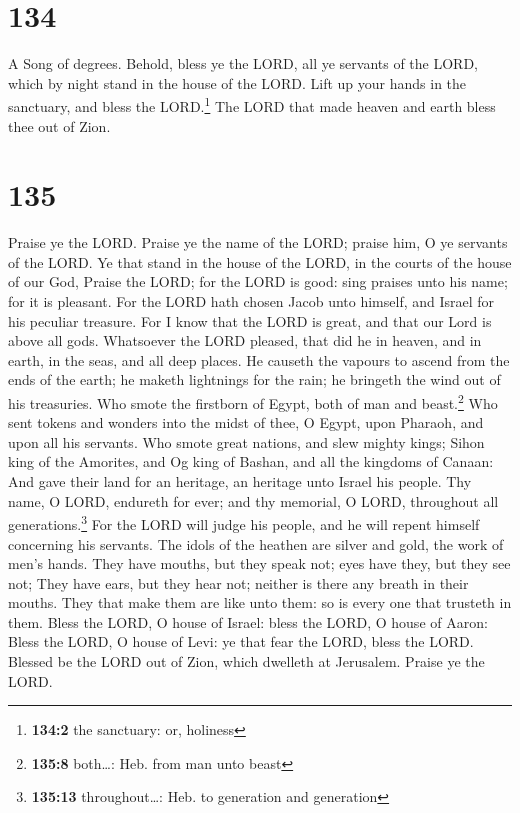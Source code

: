 \hypertarget{section-135}{%
\section{134}\label{section-135}}

A Song of degrees.  Behold, bless ye the LORD, all ye
servants of the LORD, which by night stand in the house of the LORD.
 Lift up your hands in the sanctuary, and bless the
LORD.\footnote{\textbf{134:2} the sanctuary: or, holiness}
 The LORD that made heaven and earth bless thee out of
Zion.

\hypertarget{section-136}{%
\section{135}\label{section-136}}

 Praise ye the LORD. Praise ye the name of the LORD;
praise him, O ye servants of the LORD.  Ye that stand in
the house of the LORD, in the courts of the house of our God,
 Praise the LORD; for the LORD is good: sing praises unto
his name; for it is pleasant.  For the LORD hath chosen
Jacob unto himself, and Israel for his peculiar treasure. 
For I know that the LORD is great, and that our Lord is above all gods.
 Whatsoever the LORD pleased, that did he in heaven, and
in earth, in the seas, and all deep places.  He causeth
the vapours to ascend from the ends of the earth; he maketh lightnings
for the rain; he bringeth the wind out of his treasuries. 
Who smote the firstborn of Egypt, both of man and beast.\footnote{\textbf{135:8}
  both\ldots: Heb. from man unto beast}  Who sent tokens
and wonders into the midst of thee, O Egypt, upon Pharaoh, and upon all
his servants.  Who smote great nations, and slew mighty
kings;  Sihon king of the Amorites, and Og king of
Bashan, and all the kingdoms of Canaan:  And gave their
land for an heritage, an heritage unto Israel his people.
 Thy name, O LORD, endureth for ever; and thy memorial, O
LORD, throughout all generations.\footnote{\textbf{135:13}
  throughout\ldots: Heb. to generation and generation} 
For the LORD will judge his people, and he will repent himself
concerning his servants.  The idols of the heathen are
silver and gold, the work of men's hands.  They have
mouths, but they speak not; eyes have they, but they see not;
 They have ears, but they hear not; neither is there any
breath in their mouths.  They that make them are like
unto them: so is every one that trusteth in them.  Bless
the LORD, O house of Israel: bless the LORD, O house of Aaron:
 Bless the LORD, O house of Levi: ye that fear the LORD,
bless the LORD.  Blessed be the LORD out of Zion, which
dwelleth at Jerusalem. Praise ye the LORD.

